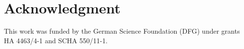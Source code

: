 \documentclass[conference]{IEEEtran}
\begin{document}




\section*{Acknowledgment}
This work was funded by the German Science Foundation (DFG) under grants HA 4463\slash4-1 and SCHA 550/11-1.
\footnotesize








%
%
%
%
%




\end{document}
